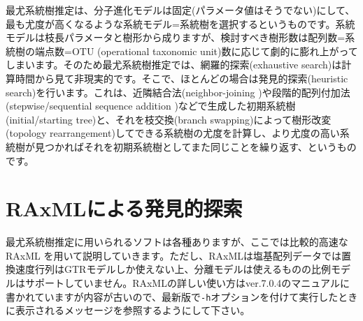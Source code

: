 \documentclass[titlepage,10pt,a4paper]{jsbook}
\begin{document}
最尤系統樹推定は、分子進化モデルは固定(パラメータ値はそうでない)にして、最も尤度が高くなるような系統モデル=系統樹を選択するというものです。系統モデルは枝長パラメータと樹形から成りますが、検討すべき樹形数は配列数=系統樹の端点数=OTU (operational taxonomic unit)数に応じて劇的に膨れ上がってしまいます。そのため最尤系統樹推定では、網羅的探索(exhaustive search)は計算時間から見て非現実的です。そこで、ほとんどの場合は発見的探索(heuristic search)を行います。これは、近隣結合法(neighbor-joining \citep{Saitou1987})や段階的配列付加法(stepwise/sequential sequence addition \citep{Swofford1993})などで生成した初期系統樹(initial/starting tree)と、それを枝交換(branch swapping)によって樹形改変(topology rearrangement)してできる系統樹の尤度を計算し、より尤度の高い系統樹が見つかればそれを初期系統樹としてまた同じことを繰り返す、というものです。

\section{RAxMLによる発見的探索}

最尤系統樹推定に用いられるソフトは各種ありますが、ここでは比較的高速なRAxML \citep{Stamatakis2006}を用いて説明していきます。ただし、RAxMLは塩基配列データでは置換速度行列はGTRモデルしか使えない上、分離モデルは使えるものの比例モデルはサポートしていません。RAxMLの詳しい使い方はver.7.0.4のマニュアルに書かれていますが内容が古いので、最新版で\texttt{-h}オプションを付けて実行したときに表示されるメッセージを参照するようにして下さい。
\end{document}
